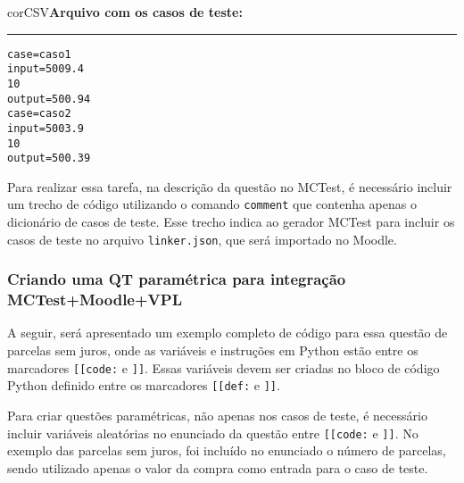 \begin{myboxCode}{corCSV}{\textbf{Arquivo com os casos de teste:}}\vspace{3mm}
\hrule
\begin{verbatim}
case=caso1
input=5009.4
10
output=500.94
case=caso2
input=5003.9
10
output=500.39
\end{verbatim}
\end{myboxCode}

Para realizar essa tarefa, na descrição da questão no MCTest, é necessário incluir um trecho de código utilizando o comando \verb|comment| que contenha apenas o dicionário de casos de teste. Esse trecho indica ao gerador MCTest para incluir os casos de teste no arquivo \verb|linker.json|, que será importado no Moodle.


\subsubsection{Criando uma QT paramétrica para integração MCTest+Moodle+VPL}

A seguir, será apresentado um exemplo completo de código para essa questão de parcelas sem juros, onde as variáveis e instruções em Python estão entre os marcadores \verb|[[code:| e \verb|]]|. Essas variáveis devem ser criadas no bloco de código Python definido entre os marcadores \verb|[[def:| e \verb|]]|.

Para criar questões paramétricas, não apenas nos casos de teste, é necessário incluir variáveis aleatórias no enunciado da questão entre \verb|[[code:| e \verb|]]|. No exemplo das parcelas sem juros, foi incluído no enunciado o número de parcelas, sendo utilizado apenas o valor da compra como entrada para o caso de teste.



